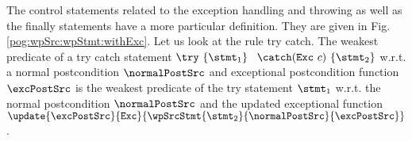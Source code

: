 The control statements related to the exception handling and throwing as well as the finally statements
 have a more particular definition. They are given in Fig. \ref{pog:wpSrc:wpStmt:withExc}. 
Let us look at the rule \textsf{try catch}. %
 The weakest predicate of a try catch statement $ \try \ \{ \stmt_1 \} \ $ 
$\catch (  \mbox{\rm\texttt{Exc}} \ c )\ \{ \stmt_2 \} $  w.r.t. a normal postcondition   $\normalPostSrc$  and exceptional postcondition function $ \excPostSrc$
is the weakest predicate of the try statement $\stmt_1$ w.r.t. the normal postcondition  $\normalPostSrc$  and the updated exceptional function
$\update{\excPostSrc}{ \mbox{\rm\texttt{Exc}} }{\wpSrcStmt{\stmt_2}{ \normalPostSrc}{\excPostSrc} }$.


